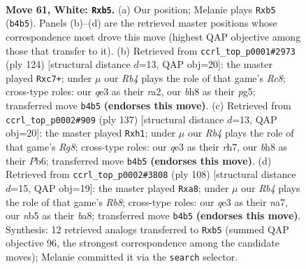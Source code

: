 \documentclass[11pt]{article}
\begin{document}
\clearpage

\begin{figure}[p]\centering
\begin{subfigure}{0.46\textwidth}\centering
\resizebox{\linewidth}{!}{%
\newchessgame
\chessboard[
  setfen={5k1b/5p2/8/1n1P4/1R6/4q3/8/5K2 w - - 8 61},
  showmover=false,
  pgfstyle=straightmove, color=movearrow, markmove={b4-b5}
]}
\caption{}
\end{subfigure}\hfill
\begin{subfigure}{0.46\textwidth}\centering
\resizebox{\linewidth}{!}{%
\newchessgame
\chessboard[
  setfen={2R5/P1n1kp2/8/6p1/8/1P6/r7/3K4 w - - 8 63},
  showmover=false,
  pgfstyle=straightmove, color=movearrow, markmove={c8-c7}
]}
\caption{}
\end{subfigure}
\\[4pt]
\begin{subfigure}{0.46\textwidth}\centering
\resizebox{\linewidth}{!}{%
\newchessgame
\chessboard[
  setfen={k7/7R/1p6/8/8/1PK5/7p/6rN b - - 3 69},
  showmover=false,
  pgfstyle=straightmove, color=movearrow, markmove={g1-h1}
]}
\caption{}
\end{subfigure}\hfill
\begin{subfigure}{0.46\textwidth}\centering
\resizebox{\linewidth}{!}{%
\newchessgame
\chessboard[
  setfen={bR6/n4p2/4k3/8/8/6K1/8/8 w - - 0 55},
  showmover=false,
  pgfstyle=straightmove, color=movearrow, markmove={b8-a8}
]}
\caption{}
\end{subfigure}
\caption{\textbf{Move 61, White: \texttt{Rxb5}.} (a) Our position; Melanie plays \texttt{Rxb5} (\texttt{b4b5}). Panels (b)--(d) are the retrieved master positions whose correspondence most drove this move (highest QAP objective among those that transfer to it). (b) Retrieved from \texttt{ccrl\_top\_p0001\#2973} (ply 124) [structural distance $d$=13, QAP obj=20]: the master played \texttt{Rxc7+}; under $\mu$ our \emph{Rb4} plays the role of that game's \emph{Rc8}; cross-type roles: our \emph{q}e3 as their \emph{r}a2, our \emph{b}h8 as their \emph{p}g5; transferred move \texttt{b4b5} \textbf{(endorses this move)}. (c) Retrieved from \texttt{ccrl\_top\_p0002\#909} (ply 137) [structural distance $d$=13, QAP obj=20]: the master played \texttt{Rxh1}; under $\mu$ our \emph{Rb4} plays the role of that game's \emph{Rg8}; cross-type roles: our \emph{q}e3 as their \emph{r}h7, our \emph{b}h8 as their \emph{P}b6; transferred move \texttt{b4b5} \textbf{(endorses this move)}. (d) Retrieved from \texttt{ccrl\_top\_p0002\#3808} (ply 108) [structural distance $d$=15, QAP obj=19]: the master played \texttt{Rxa8}; under $\mu$ our \emph{Rb4} plays the role of that game's \emph{Rb8}; cross-type roles: our \emph{q}e3 as their \emph{n}a7, our \emph{n}b5 as their \emph{b}a8; transferred move \texttt{b4b5} \textbf{(endorses this move)}. Synthesis: 12 retrieved analogs transferred to \texttt{Rxb5} (summed QAP objective 96, the strongest correspondence among the candidate moves); Melanie committed it via the \texttt{search} selector.}
\label{fig:thought-m120}
\end{figure}
\end{document}
